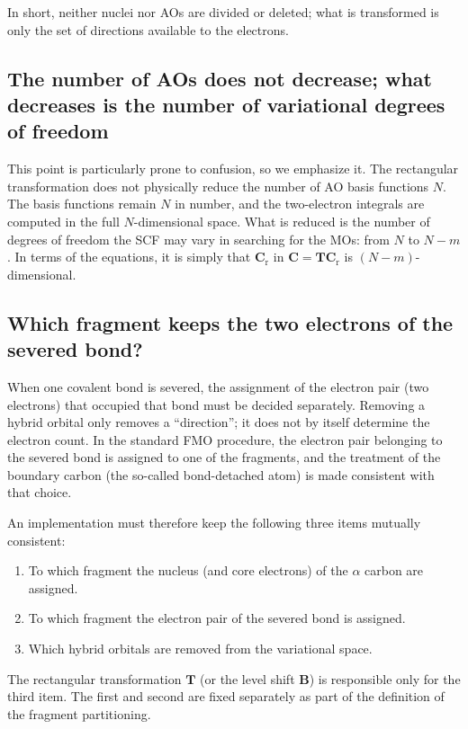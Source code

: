 \documentclass[11pt]{article}
\newcommand{\Bmat}{\mathbf B}
\newcommand{\Tmat}{\mathbf T}
\newcommand{\Cmat}{\mathbf C}
\newcommand{\Cr}{\mathbf C_{\mathrm r}}
\begin{document}
In short, neither nuclei nor AOs are divided or deleted; what is
transformed is only the set of directions available to the electrons.

\subsection{The number of AOs does not decrease; what decreases is the
number of variational degrees of freedom}

This point is particularly prone to confusion, so we emphasize it. The
rectangular transformation does not physically reduce the number of AO
basis functions \(N\). The basis functions remain \(N\) in number, and
the two-electron integrals are computed in the full \(N\)-dimensional
space. What is reduced is the number of degrees of freedom the SCF may
vary in searching for the MOs: from \(N\) to \(N-m\). In terms of the
equations, it is simply that \(\Cr\) in \(\Cmat=\Tmat\Cr\) is
\((N-m)\)-dimensional.

\subsection{Which fragment keeps the two electrons of the severed bond?}

When one covalent bond is severed, the assignment of the electron pair
(two electrons) that occupied that bond must be decided separately.
Removing a hybrid orbital only removes a ``direction''; it does not by
itself determine the electron count. In the standard FMO procedure, the
electron pair belonging to the severed bond is assigned to one of the
fragments, and the treatment of the boundary carbon (the so-called
bond-detached atom) is made consistent with that choice.

An implementation must therefore keep the following three items
mutually consistent:

\begin{enumerate}
\item To which fragment the nucleus (and core electrons) of the
      \(\alpha\) carbon are assigned.
\item To which fragment the electron pair of the severed bond is
      assigned.
\item Which hybrid orbitals are removed from the variational space.
\end{enumerate}

The rectangular transformation \(\Tmat\) (or the level shift
\(\Bmat\)) is responsible only for the third item. The first and
second are fixed separately as part of the definition of the fragment
partitioning.
\end{document}
